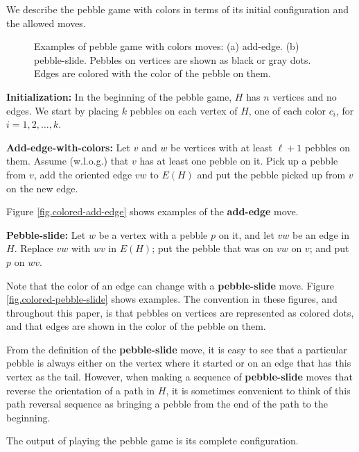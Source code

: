 \documentclass[Svgc,nospthms]{Svgc}
\newcommand{\reffig}[1]{Figure \ref{fig.#1}}
\begin{document}
We describe the pebble game with colors in terms of its initial configuration
and the allowed moves.

\begin{figure}[htbp]
	\centering
	\hspace{.3in}
	\caption{Examples of pebble game with colors moves: (a) add-edge. (b) pebble-slide.
	Pebbles on vertices are shown as black or gray dots.  Edges are colored with the color
	of the pebble on them.}
\end{figure}

	\medskip
	{\bf Initialization:} In the beginning of the pebble game, $H$ has
	$n$ vertices and no edges.  We start by placing $k$ pebbles on each
	vertex of $H$, one of each color $c_i$, for $i=1,2,\ldots,k$.

	{\bf Add-edge-with-colors:} Let $v$ and $w$ be vertices with at least 
	$\ell+1$ pebbles on them. Assume (w.l.o.g.) that $v$ has at least one 
	pebble on it.
	Pick up a pebble from $v$, add the oriented edge $vw$ to $E(H)$ and put 
	the pebble picked up from $v$ on the new edge.
	
 
	\reffig{colored-add-edge} shows examples of the {\bf add-edge} move.

	{\bf Pebble-slide:} Let $w$ be a vertex with a pebble $p$ 
	on it, and let $vw$ be an edge in $H$. Replace $vw$ with $wv$ in $E(H)$; 
	put the pebble that was on  $vw$ on $v$;  and put $p$ on $wv$.
	
	Note that the color of an edge can change with a {\bf pebble-slide} move.
	 \reffig{colored-pebble-slide} shows examples.   The convention
	in these figures, and throughout this paper, is that pebbles on vertices
	are represented as colored dots, and that edges are shown in the color
	of the pebble on them.
	
	From the definition of the {\bf pebble-slide} move, it is easy to see that 
	a particular pebble is always either on the vertex where it started or on 
	an edge that has this vertex as the tail.  However, when making a sequence 
	of {\bf pebble-slide} moves that reverse the orientation of a path in $H$, 
	it is sometimes convenient to think of this path reversal sequence as 
	bringing a pebble from the end of the path to the beginning.

	\medskip
	The output of playing the pebble game is its complete configuration.
\end{document}
